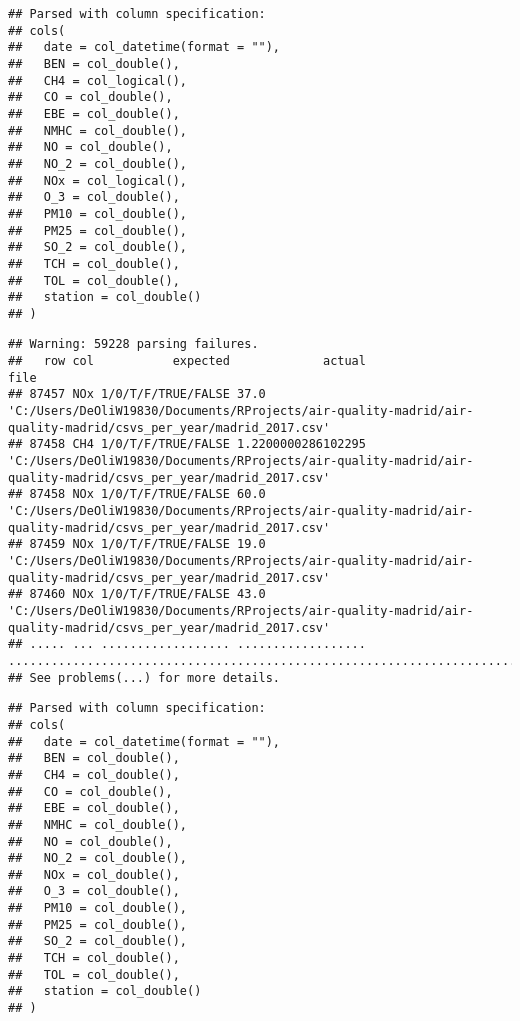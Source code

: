 \documentclass[
]{article}
\begin{document}
\begin{verbatim}
## Parsed with column specification:
## cols(
##   date = col_datetime(format = ""),
##   BEN = col_double(),
##   CH4 = col_logical(),
##   CO = col_double(),
##   EBE = col_double(),
##   NMHC = col_double(),
##   NO = col_double(),
##   NO_2 = col_double(),
##   NOx = col_logical(),
##   O_3 = col_double(),
##   PM10 = col_double(),
##   PM25 = col_double(),
##   SO_2 = col_double(),
##   TCH = col_double(),
##   TOL = col_double(),
##   station = col_double()
## )
\end{verbatim}

\begin{verbatim}
## Warning: 59228 parsing failures.
##   row col           expected             actual                                                                                                           file
## 87457 NOx 1/0/T/F/TRUE/FALSE 37.0               'C:/Users/DeOliW19830/Documents/RProjects/air-quality-madrid/air-quality-madrid/csvs_per_year/madrid_2017.csv'
## 87458 CH4 1/0/T/F/TRUE/FALSE 1.2200000286102295 'C:/Users/DeOliW19830/Documents/RProjects/air-quality-madrid/air-quality-madrid/csvs_per_year/madrid_2017.csv'
## 87458 NOx 1/0/T/F/TRUE/FALSE 60.0               'C:/Users/DeOliW19830/Documents/RProjects/air-quality-madrid/air-quality-madrid/csvs_per_year/madrid_2017.csv'
## 87459 NOx 1/0/T/F/TRUE/FALSE 19.0               'C:/Users/DeOliW19830/Documents/RProjects/air-quality-madrid/air-quality-madrid/csvs_per_year/madrid_2017.csv'
## 87460 NOx 1/0/T/F/TRUE/FALSE 43.0               'C:/Users/DeOliW19830/Documents/RProjects/air-quality-madrid/air-quality-madrid/csvs_per_year/madrid_2017.csv'
## ..... ... .................. .................. ..............................................................................................................
## See problems(...) for more details.
\end{verbatim}

\begin{verbatim}
## Parsed with column specification:
## cols(
##   date = col_datetime(format = ""),
##   BEN = col_double(),
##   CH4 = col_double(),
##   CO = col_double(),
##   EBE = col_double(),
##   NMHC = col_double(),
##   NO = col_double(),
##   NO_2 = col_double(),
##   NOx = col_double(),
##   O_3 = col_double(),
##   PM10 = col_double(),
##   PM25 = col_double(),
##   SO_2 = col_double(),
##   TCH = col_double(),
##   TOL = col_double(),
##   station = col_double()
## )
\end{verbatim}
\end{document}
